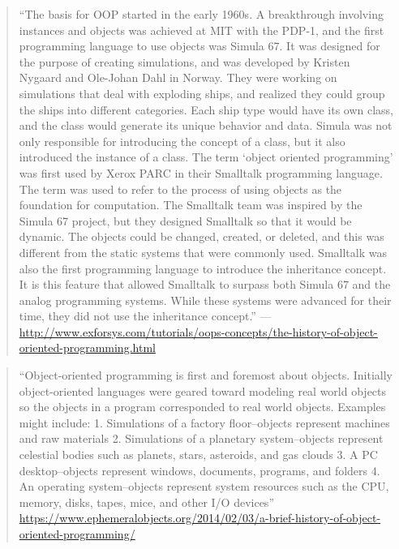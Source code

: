 \documentclass[]{tufte-book}
\begin{document}
\begin{quote}
``The basis for OOP started in the early 1960s. A breakthrough involving
instances and objects was achieved at MIT with the PDP-1, and the first
programming language to use objects was Simula 67. It was designed for the
purpose of creating simulations, and was developed by Kristen Nygaard and
Ole-Johan Dahl in Norway. They were working on simulations that deal with
exploding ships, and realized they could group the ships into different
categories. Each ship type would have its own class, and the class would
generate its unique behavior and data. Simula was not only responsible for
introducing the concept of a class, but it also introduced the instance of a
class. The term `object oriented programming' was first used by Xerox PARC in
their Smalltalk programming language. The term was used to refer to the process
of using objects as the foundation for computation. The Smalltalk team was
inspired by the Simula 67 project, but they designed Smalltalk so that it would
be dynamic. The objects could be changed, created, or deleted, and this was
different from the static systems that were commonly used. Smalltalk was also
the first programming language to introduce the inheritance concept. It is this
feature that allowed Smalltalk to surpass both Simula 67 and the analog
programming systems. While these systems were advanced for their time, they did
not use the inheritance concept.'' ---
\url{http://www.exforsys.com/tutorials/oops-concepts/the-history-of-object-oriented-programming.html}
\end{quote}

\begin{quote}
``Object-oriented programming is first and foremost about objects. Initially
object-oriented languages were geared toward modeling real world objects so the
objects in a program corresponded to real world objects. Examples might include:
1. Simulations of a factory floor--objects represent machines and raw materials
2. Simulations of a planetary system--objects represent celestial bodies such as
planets, stars, asteroids, and gas clouds 3. A PC desktop--objects represent
windows, documents, programs, and folders 4. An operating system--objects
represent system resources such as the CPU, memory, disks, tapes, mice, and
other I/O devices''
\url{https://www.ephemeralobjects.org/2014/02/03/a-brief-history-of-object-oriented-programming/}
\end{quote}
\end{document}

